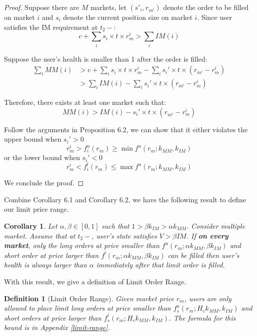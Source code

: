 \documentclass[notitlepage,reqno,11pt]{amsart}
\numberwithin{equation}{section}
\newtheorem{definition}{Definition}[section]
\newtheorem{coro}{Corollary}[section]
\newcommand{\af}{\alpha}
\newcommand{\bt}{\beta}
\begin{document}
\begin{proof}
    Suppose there are $M$ markets, let $(s'_i, r_{m^i})$ denote the order to be filled on market $i$ and $s_i$ denote the current position size on market $i$. Since user satisfies the IM requirement at $t_2-$: 
    $$
    c + \sum_i s_i\times t\times r^i_m > \sum_i IM(i)
    $$

    Suppose the user's health is smaller than 1 after the order is filled: 
    \begin{align*}
    \sum_i MM(i) &> c + \sum_i s_i\times t\times r^i_m - \sum_i s_i'\times t\times (r_{m^i}-r^i_m)\\
    &> \sum_i IM(i) - \sum_i s_i'\times t\times (r_{m^i}-r^i_m)
    \end{align*}

    Therefore, there exists at least one market such that:
    $$
    MM(i) > IM(i) - s_i'\times t\times (r_{m^i}-r^i_m)
    $$

    Follow the arguments in Proposition 6.2, we can show that it either violates the upper bound when $s_i' > 0$
    $$
    r^i_m > f^u_i(r_m) \geq \min f^u(r_m; k_{MM}, k_{IM})
    $$  
    or the lower bound when $s_i' < 0$
    $$r^i_m < f^l_i(r_m) \leq \max f^u(r_m; k_{MM}, k_{IM})$$

    We conclude the proof.
    
\end{proof}

Combine Corollary 6.1 and Corollary 6.2, we have the following result to define our limit price range.

\begin{coro}\label{5.3}
    Let $\af, \bt\in[0,1]$ such that $1>\bt k_{IM} > \af k_{MM}$. Consider multiple market. Assume that at $t_2-$, user's state satisfies $V > \bt IM$. If \textbf{on every market}, only the long orders at price smaller than $f^u(r_m;\af k_{MM}, \bt k_{IM})$ and short order at price larger than $f^l(r_m;\af  k_{MM}, \bt k_{IM})$ can be filled then user's health is always larger than $\af$ immediately after that limit order is filled.
\end{coro}

With this result, we give a definition of Limit Order Range.
\begin{definition}[Limit Order Range]
    Given market price $r_m$, users are only allowed to place limit long orders at price smaller than $f^u_s(r_m;H_c k_{MM}, k_{IM})$ and short orders at price larger than $f^l_s(r_m;H_c k_{MM}, k_{IM})$. 
    The formula for this bound is in Appendix \ref{limit-range}. 
\end{definition}
\end{document}
